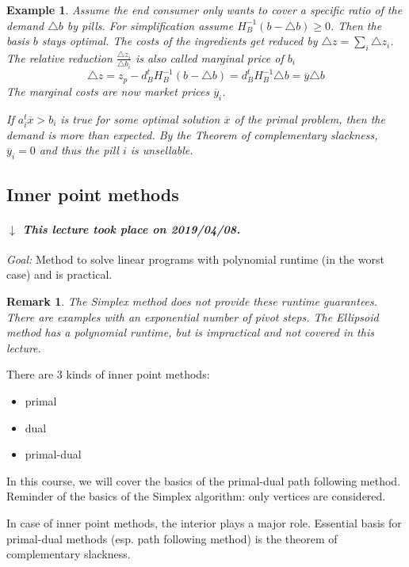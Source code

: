 \documentclass[a4paper]{article}
\numberwithin{lecref}{subsection}
\newcounter{exercises}
\newtheorem{example}[exercises]{Example}
\newtheorem*{Remark}{Remark}
\newcommand{\dateref}[1]{%
  \begin{mdframed}[backgroundcolor=gray!10,innerbottommargin=0pt,innertopmargin=0pt]
    \paragraph{\textit{$\downarrow$ This lecture took place on #1.}}%
  \end{mdframed}%
}
\begin{document}
\begin{example}
	Assume the end consumer only wants to cover a specific ratio of the demand $\triangle b$ by pills.
	For simplification assume $H_B^{-1}(b - \triangle b) \geq 0$. Then the basis $b$ stays optimal.
	The costs of the ingredients get reduced by $\triangle z = \sum_i \triangle z_i$.
	The relative reduction $\frac{\triangle z_i}{\triangle b_i}$ is also called marginal price of $b_i$
	\[ \triangle z = z_p - d_B^t H_B^{-1} (b - \triangle b) = d_B^t H_B^{-1} \triangle b = \overline{y} \triangle b \]
	The marginal costs are now market prices $\overline{y}_i$.

	If $a_i^t \overline{x} > b_i$ is true for some optimal solution $\overline{x}$ of the primal problem,
	then the demand is more than expected. By the Theorem of complementary slackness,
	$\overline{y}_i = 0$ and thus the pill $i$ is unsellable.
\end{example}

\clearpage
\subsection{Inner point methods}
\label{section:1.5}
\dateref{2019/04/08}
\emph{Goal:} Method to solve linear programs with polynomial runtime (in the worst case) and is practical.

\begin{Remark}
	The Simplex method does not provide these runtime guarantees.
	There are examples with an exponential number of pivot steps.
	The Ellipsoid method has a polynomial runtime, but is impractical and not covered in this lecture.
\end{Remark}

There are 3 kinds of inner point methods:
\begin{itemize}
	\item primal
	\item dual
	\item primal-dual
\end{itemize}

In this course, we will cover the basics of the primal-dual path following method.
Reminder of the basics of the Simplex algorithm: only vertices are considered.

In case of inner point methods, the interior plays a major role.
Essential basis for primal-dual methods (esp. path following method) is the theorem of complementary slackness.
\end{document}
